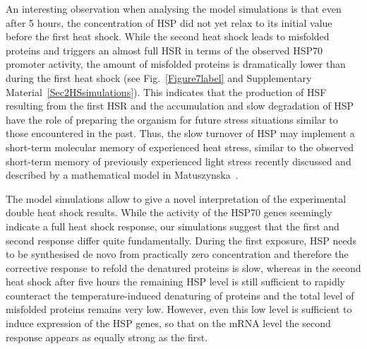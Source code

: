 \documentclass[oneside, 10pt, a4paper, twocolumn]{article}
\begin{document}
An interesting observation when analysing the model simulations is
that even after 5 hours, the concentration of HSP did not yet relax
to its initial value before the first heat shock. 
While the second heat shock leads to misfolded
proteins and triggers an almost full HSR in terms of 
the observed HSP70 promoter activity, the amount of misfolded proteins
is dramatically lower than during the first heat shock (see Fig.~\ref{Figure7label} 
and Supplementary Material~\ref{Sec2HSsimulations}). 
This indicates that the 
production of HSF resulting from the first HSR and the accumulation
and slow degradation of HSP have the role of preparing the organism for future
stress situations similar to those encountered in the past. Thus, the slow turnover of HSP may
implement a short-term molecular memory of experienced heat stress,
similar to the observed short-term memory of previously experienced light
stress recently discussed and described by a mathematical model 
in Matuszynska~\cite{Matuszynska2016}.

The model simulations allow to give a novel interpretation of
the experimental  double heat shock results. While the
activity of the HSP70 genes seemingly indicate a full heat shock response, our simulations suggest that the first and second response differ quite fundamentally.
During the first exposure, HSP needs to be synthesised de novo
from practically zero concentration and therefore the corrective
response to refold the denatured proteins is slow, whereas in the second heat
shock after five hours the remaining HSP level is still sufficient to rapidly
counteract the temperature-induced denaturing of proteins and the total
level of misfolded proteins remains very low. However, even this low level is
sufficient to induce expression of the HSP genes, so that on the mRNA level
the second response appears as equally strong as the first.


\end{document}
